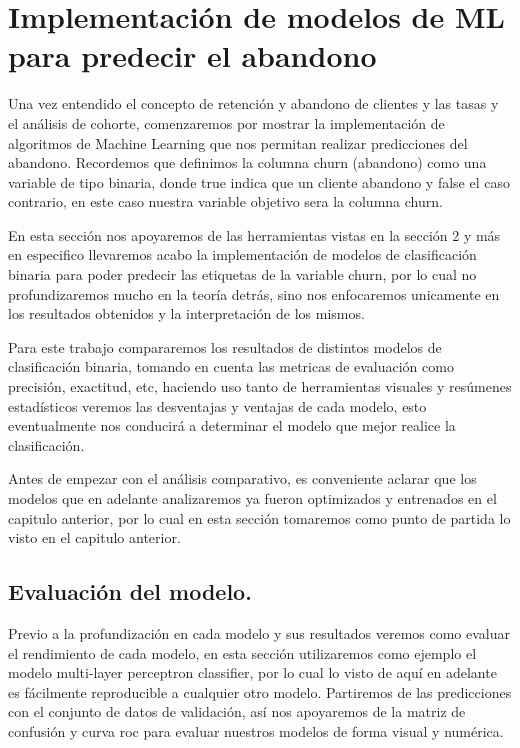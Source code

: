 \newpage
\section{Implementación de modelos de ML para predecir el abandono}

Una vez entendido el concepto de retención y abandono de clientes y las tasas y el análisis de cohorte, comenzaremos por mostrar la implementación de algoritmos de Machine Learning que nos permitan realizar predicciones del abandono. Recordemos que definimos la columna churn (abandono) como una variable de tipo binaria, donde true indica que un cliente abandono y false el caso contrario, en este caso nuestra variable objetivo sera la columna churn. 

En esta sección nos apoyaremos de las herramientas vistas en la sección 2 y más en especifico llevaremos acabo la implementación de modelos de clasificación binaria para poder predecir las etiquetas de la variable churn, por lo cual no profundizaremos mucho en la teoría detrás, sino nos enfocaremos unicamente en los resultados obtenidos y la interpretación de los mismos.

Para este trabajo compararemos los resultados de distintos modelos de clasificación binaria, tomando en cuenta las metricas de evaluación como precisión, exactitud, etc, haciendo uso tanto de herramientas visuales y resúmenes estadísticos veremos las desventajas y ventajas de cada modelo, esto eventualmente nos conducirá a determinar el modelo que mejor realice la clasificación.


Antes de empezar con el análisis comparativo, es conveniente aclarar que los modelos que en adelante analizaremos ya fueron optimizados y entrenados en el capitulo anterior, por lo cual en esta sección tomaremos como punto de partida lo visto en el capitulo anterior. 

\subsection{Evaluación del modelo.}

Previo a la profundización en cada modelo y sus resultados veremos como evaluar el rendimiento de cada modelo, en esta sección utilizaremos como ejemplo el modelo multi-layer perceptron classifier, por lo cual lo visto de aquí en adelante es fácilmente reproducible a cualquier otro modelo. Partiremos de las predicciones con el conjunto de datos de validación, así nos apoyaremos de la matriz de confusión y curva roc para evaluar nuestros modelos de forma visual y numérica.

